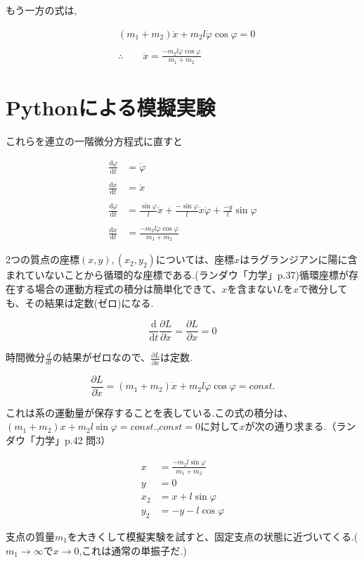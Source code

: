 もう一方の式は,

\begin{align*}
   &(m_1+m_2)\ddot{x}+m_2l\dot{\varphi}\cos\varphi=0\\\\
   &\therefore \qquad \ddot{x}=\displaystyle\frac{-m_2l\dot{\varphi}\cos\varphi}{m_1+m_2}
\end{align*}

\section{Pythonによる模擬実験}

これらを連立の一階微分方程式に直すと

\begin{align*}
   \displaystyle\frac{\mathrm{d}\varphi}{\mathrm{d}t}&=\dot{\varphi}\\\\
   \displaystyle\frac{\mathrm{d}x}{\mathrm{d}t}&=\dot{x}\\\\
   \displaystyle\frac{\mathrm{d}\dot{\varphi}}{\mathrm{d}t}&=\displaystyle\frac{\sin\varphi}{l}\dot{x}+\frac{-\sin\varphi}{l}\dot{x}\dot{\varphi}+\frac{-g}{l}\sin\varphi\\\\
   \displaystyle\frac{\mathrm{d}\dot{x}}{\mathrm{d}t}&=\displaystyle\frac{-m_2l\dot{\varphi}\cos\varphi}{m_1+m_2}
\end{align*}

2つの質点の座標$(x,y),(x_2,y_2)$については、座標$x$はラグランジアンに陽に含まれていないことから循環的な座標である.(ランダウ「力学」p.37)循環座標が存在する場合の運動方程式の積分は簡単化できて、$x$を含まない$L$を$x$で微分しても、その結果は定数(ゼロ)になる.

\[\displaystyle\frac{\mathrm{d}}{\mathrm{d}t}\frac{\partial L}{\partial \dot{x}}=\frac{\partial L}{\partial x}=0\]

時間微分$\displaystyle\frac{d}{dt}$の結果がゼロなので、$\displaystyle\frac{\partial L}{\partial\dot{x}}$は定数.

\[\displaystyle\frac{\partial L}{\partial \dot{x}}=(m_1+m_2)\dot{x}+m_2l\dot{\varphi}\cos\varphi=const.\]

これは系の運動量が保存することを表している.この式の積分は、
$(m_1+m_2)x + m_2l\sin\varphi = const.$,$const=0$に対して$x$が次の通り求まる.（ランダウ「力学」p.42 問3）

\begin{align*}
   x&=\frac{-m_2l\sin\varphi}{m_1+m_2}\\
   y&=0\\
   x_2&=x+l\sin\varphi\\
   y_2&=-y-l\cos\varphi
\end{align*}

支点の質量$m_1$を大きくして模擬実験を試すと、固定支点の状態に近づいてくる.($m_1\rightarrow\infty$で$x\rightarrow 0$,これは通常の単振子だ.)

\lstset{escapechar=@,style=custompy}

